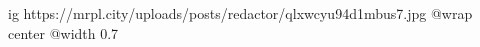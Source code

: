  
 
 
 
 

\ifcmt
  ig https://mrpl.city/uploads/posts/redactor/qlxwcyu94d1mbus7.jpg
  @wrap center
  @width 0.7
\fi
